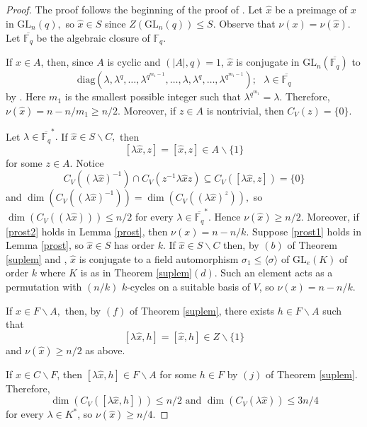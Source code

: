 \documentclass[a4paper,reqno,11pt]{amsart}
\theoremstyle{definition}
\theoremstyle{remark}
\numberwithin{equation}{section}
\newcommand{\diag}{\mathrm{diag}}
\newcommand{\GL}{{\mathrm{GL}}}
\begin{document}
\begin{proof}
The proof follows the beginning of the proof of \cite[Proposition 4]{gluck}. Let $\hat{x}$ be a preimage of $x$ in $\GL_n(q),$ so $\hat{x} \in S$ since $Z(\GL_n(q)) \le S$. Observe that $\nu(x)=\nu(\hat{x}).$ Let $\overline{\mathbb{F}_q}$ be the algebraic closure of $\mathbb{F}_q.$

If $\hat{x} \in A$, then, since $A$ is cyclic and $(|A|,q)=1$, $\hat{x}$ is conjugate in $\GL_n(\overline{\mathbb{F}_q})$ to 
$$\diag(\lambda, \lambda^q, \ldots, \lambda^{q^{m_1-1}}, \ldots, \lambda, \lambda^q, \ldots, \lambda^{q^{m_1-1}}); \text{ } \lambda \in \overline{\mathbb{F}_q}$$
by \cite[Lemma 1.3]{buturl}. Here $m_1$ is the smallest possible integer such that  $\lambda^{q^{m_1}}=\lambda.$ Therefore, $\nu(\hat{x})=n-n/m_1\ge n/2.$ Moreover, if $z \in A$ is nontrivial, then $C_V(z)=\{0\}.$

Let $\lambda \in \overline{\mathbb{F}_q}^*.$ If $\hat{x} \in S \backslash C,$ then 
$$[\lambda \hat{x}, z]=[\hat{x},z] \in A \backslash \{1\}$$ for some $z \in A.$ Notice 
$$C_V((\lambda \hat{x})^{-1}) \cap C_V(z^{-1} \lambda \hat{x} z) \subseteq C_V([\lambda \hat{x}, z])=\{0\}$$
and $\dim(C_V((\lambda \hat{x})^{-1}))= \dim(C_V((\lambda \hat{x})^{z})),$ so $ \dim (C_V((\lambda \hat{x}))) \le n/2$ for every $\lambda \in \overline{\mathbb{F}_q}^*$. Hence $\nu(\hat{x})\ge n/2.$
Moreover, if  \ref{prost2} holds in Lemma \ref{prost}, then $\nu(x)=n-n/k.$ 
Suppose \ref{prost1} holds in Lemma \ref{prost}, so $\hat{x} \in S$ has order $k.$
 If $\hat{x}  \in S \backslash C$ then, by $(b)$ of Theorem \ref{suplem} and \cite[7-2]{conjaut}, $\hat{x}$ is conjugate to a field automorphism $\sigma_1 \le \langle \sigma \rangle$ of $\GL_e(K)$ of order $k$ where $K$ is as in Theorem \ref{suplem}$(d)$.
Such an element acts as a permutation with $(n/k)$ $k$-cycles on a suitable basis of $V$, so  $\nu(x)=n-n/k$.



If $\hat{x} \in F \backslash A,$ then, by $(f)$ of Theorem \ref{suplem}, there exists $h \in F \backslash A$ such that $$[ \lambda \hat{x}, h]= [\hat{x},h] \in Z \backslash \{1\}$$ and $\nu(\hat{x}) \ge n/2$ as above.



If $\hat{x} \in C \backslash F$, then $[\lambda \hat{x}, h] \in F \backslash A$ for some $h \in F$ by $(j)$ of Theorem \ref{suplem}. Therefore, 
$$\dim (C_V([\lambda \hat{x}, h])) \le n/2 \text{ and } \dim (C_V(\lambda \hat{x})) \le 3n/4$$
for every $\lambda \in K^*$,
so $\nu(\hat{x}) \ge n/4.$
\end{proof}
\end{document}
